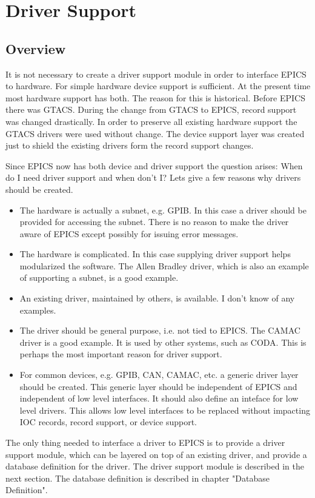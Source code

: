 \chapter{Driver Support}

\section{Overview}

It is not necessary to create a driver support module in order to interface EPICS to hardware. For simple hardware device 
support is sufficient. At the present time most hardware support has both. The reason for this is historical. Before EPICS 
there was GTACS. During the change from GTACS to EPICS, record support was changed drastically. In order to 
preserve all existing hardware support the GTACS drivers were used without change. The device support layer was 
created just to shield the existing drivers form the record support changes.

Since EPICS now has both device and driver support the question arises: When do I need driver support and when don't 
I? Lets give a few reasons why drivers should be created.

\begin{itemize}\item The hardware is actually a subnet, e.g. GPIB. In this case a driver should be provided for accessing the subnet. 
There is no reason to make the driver aware of EPICS except possibly for issuing error messages.

\item The hardware is complicated. In this case supplying driver support helps modularized the software. The Allen 
Bradley driver, which is also an example of supporting a subnet, is a good example.

\item An existing driver, maintained by others, is available. I don't know of any examples.

\item The driver should be general purpose, i.e. not tied to EPICS. The CAMAC driver is a good example. It is used by 
other systems, such as CODA. This is perhaps the most important reason for driver support.

\item For common devices, e.g. GPIB, CAN, CAMAC, etc. a generic driver layer should be created. This generic layer 
should be independent of EPICS and independent of low level interfaces. It should also define an inteface for low 
level drivers. This allows low level interfaces to be replaced without impacting IOC records, record support, or 
device support.

\end{itemize}The only thing needed to interface a driver to EPICS is to provide a driver support module, which can be layered on top of 
an existing driver, and provide a database definition for the driver. The driver support module is described in the next 
section. The database definition is described in chapter "Database Definition".


